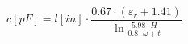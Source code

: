 \documentclass[12pt]{article}
\begin{document}
\begin{displaymath}
c [ pF ] = l [ in ] \cdot \frac{0.67 \cdot (\varepsilon_{r}+1.41)}{\ln \frac{5.98 \cdot H}{0.8 \cdot \omega + t}}
\end{displaymath}
\end{document}
